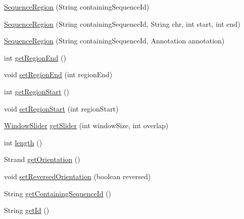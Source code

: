 \begin{DoxyCompactItemize}
\item 
\hyperlink{classbroad_1_1core_1_1sequence_1_1_sequence_region_a0b18988250e79bed3b745d6b0172893c}{Sequence\+Region} (String containing\+Sequence\+Id)
\item 
\hyperlink{classbroad_1_1core_1_1sequence_1_1_sequence_region_ac9b8bb254a99fdacf15b7491c00bfb51}{Sequence\+Region} (String containing\+Sequence\+Id, String chr, int start, int end)
\item 
\hyperlink{classbroad_1_1core_1_1sequence_1_1_sequence_region_a625f9ec624ec90b94b0feccddf003d6d}{Sequence\+Region} (String containing\+Sequence\+Id, Annotation annotation)
\item 
int \hyperlink{classbroad_1_1core_1_1sequence_1_1_sequence_region_a8963e3dc03bcfbdf74a57bb016b64cfb}{get\+Region\+End} ()
\item 
void \hyperlink{classbroad_1_1core_1_1sequence_1_1_sequence_region_a1f6c341d0e4aa8f0f7be09ae403167a1}{set\+Region\+End} (int region\+End)
\item 
int \hyperlink{classbroad_1_1core_1_1sequence_1_1_sequence_region_aa2f6c6d9bcf5b511b084490c58867a15}{get\+Region\+Start} ()
\item 
void \hyperlink{classbroad_1_1core_1_1sequence_1_1_sequence_region_a2d73403c15168f6cf0033dd6f861686d}{set\+Region\+Start} (int region\+Start)
\item 
\hyperlink{classbroad_1_1core_1_1sequence_1_1_window_slider}{Window\+Slider} \hyperlink{classbroad_1_1core_1_1sequence_1_1_sequence_region_a05fc6d4159079357daf6d1fb510ef3b7}{get\+Slider} (int window\+Size, int overlap)
\item 
int \hyperlink{classbroad_1_1core_1_1sequence_1_1_sequence_region_a29a5e3028670cb9095a5181e2b2b191b}{length} ()
\item 
Strand \hyperlink{classbroad_1_1core_1_1sequence_1_1_sequence_region_a0e94aaa43793d75bd5c34d0a7e71f1a1}{get\+Orientation} ()
\item 
void \hyperlink{classbroad_1_1core_1_1sequence_1_1_sequence_region_a25bfe99c413ee0e893d687509add2dd8}{set\+Reversed\+Orientation} (boolean reversed)
\item 
String \hyperlink{classbroad_1_1core_1_1sequence_1_1_sequence_region_addecf6e872fb99d85e68f6503a3eb9b2}{get\+Containing\+Sequence\+Id} ()
\item 
String \hyperlink{classbroad_1_1core_1_1sequence_1_1_sequence_region_a3a81800b533cb2f0a880c5158741ebd0}{get\+Id} ()
\item 

\end{DoxyCompactItemize}
